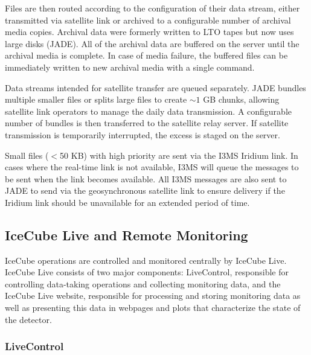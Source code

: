 Files are then routed according to the configuration of their
data stream, either transmitted via satellite link or 
archived to a configurable number of archival media copies.  Archival data
were formerly written to LTO tapes but now uses large disks (JADE).
All of the archival data are buffered on the server until the archival media
is complete. In case of media failure, the buffered files can be 
immediately written to new archival media with a single command.

Data streams intended for satellite transfer are queued separately.  
JADE bundles multiple smaller files or splits large files to create $\sim1$
GB chunks, allowing satellite link operators to manage the daily data
transmission.  A configurable number of bundles is then transferred to the
satellite relay server.  If satellite transmission is temporarily
interrupted, the excess is staged on the server. 

Small files ($<$50 KB) with high priority are sent via
the I3MS Iridium link.  In cases where the real-time link is not available, I3MS
will queue the messages to be sent when the link becomes available. All
I3MS messages are also sent to JADE to send via the geosynchronous satellite link to
ensure delivery if the Iridium link should be unavailable for an extended
period of time.

\subsection{\label{sec:online:icecubelive}IceCube Live and Remote Monitoring}

IceCube operations are controlled and monitored centrally by IceCube Live.
IceCube Live consists of two major components: LiveControl,
responsible for controlling data-taking operations and collecting
monitoring data, and the IceCube Live website, responsible for processing
and storing monitoring data as well as presenting this data in webpages and
plots that characterize the state of the detector.

\subsubsection{LiveControl}

